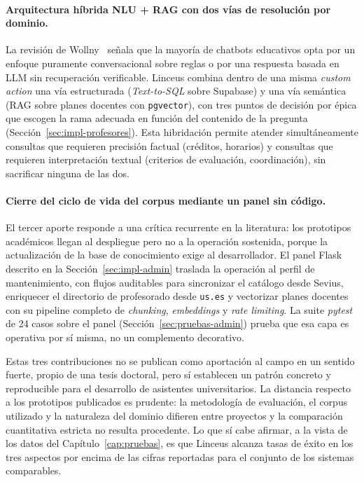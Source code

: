 \paragraph{Arquitectura híbrida NLU + RAG con dos vías de resolución por dominio.} La revisión de Wollny~\cite{wollny2021survey} señala que la mayoría de chatbots educativos opta por un enfoque puramente conversacional sobre reglas o por una respuesta basada en LLM sin recuperación verificable. Linceus combina dentro de una misma \textit{custom action} una vía estructurada (\textit{Text-to-SQL} sobre Supabase) y una vía semántica (RAG sobre planes docentes con \texttt{pgvector}), con tres puntos de decisión por épica que escogen la rama adecuada en función del contenido de la pregunta (Sección~\ref{sec:impl-profesores}). Esta hibridación permite atender simultáneamente consultas que requieren precisión factual (créditos, horarios) y consultas que requieren interpretación textual (criterios de evaluación, coordinación), sin sacrificar ninguna de las dos.

\paragraph{Cierre del ciclo de vida del corpus mediante un panel sin código.} El tercer aporte responde a una crítica recurrente en la literatura: los prototipos académicos llegan al despliegue pero no a la operación sostenida, porque la actualización de la base de conocimiento exige al desarrollador. El panel Flask descrito en la Sección~\ref{sec:impl-admin} traslada la operación al perfil de mantenimiento, con flujos auditables para sincronizar el catálogo desde Sevius, enriquecer el directorio de profesorado desde \texttt{us.es} y vectorizar planes docentes con su pipeline completo de \textit{chunking}, \textit{embeddings} y \textit{rate limiting}. La suite \textit{pytest} de 24 casos sobre el panel (Sección~\ref{sec:pruebas-admin}) prueba que esa capa es operativa por sí misma, no un complemento decorativo.

Estas tres contribuciones no se publican como aportación al campo en un sentido fuerte, propio de una tesis doctoral, pero sí establecen un patrón concreto y reproducible para el desarrollo de asistentes universitarios. La distancia respecto a los prototipos publicados es prudente: la metodología de evaluación, el corpus utilizado y la naturaleza del dominio difieren entre proyectos y la comparación cuantitativa estricta no resulta procedente. Lo que sí cabe afirmar, a la vista de los datos del Capítulo~\ref{cap:pruebas}, es que Linceus alcanza tasas de éxito en los tres aspectos por encima de las cifras reportadas para el conjunto de los sistemas comparables.

